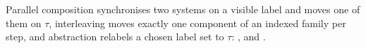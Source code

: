 \begin{definition}
  \label{def:process-algebra}
  \leanok
  Parallel composition synchronises two systems on a visible label and moves one of them on $\tau$, interleaving moves exactly one component of an indexed family per step, and abstraction relabels a chosen label set to $\tau$: ,  and .
\end{definition}
